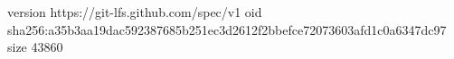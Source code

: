 version https://git-lfs.github.com/spec/v1
oid sha256:a35b3aa19dac592387685b251ec3d2612f2bbefce72073603afd1c0a6347dc97
size 43860
